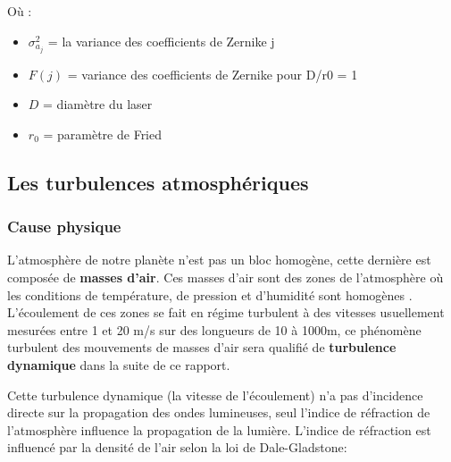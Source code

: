 Où :
\begin{itemize}
  \item $\sigma_{a_j}^2$ = la variance des coefficients de Zernike j
  \item  $F(j)$ = variance des coefficients de Zernike pour D/r0 = 1
  \item $D$ = diamètre du laser
  \item $r_0$ = paramètre de Fried
\end{itemize}

\subsection{Les turbulences atmosphériques}

\subsubsection{Cause physique}
L'atmosphère de notre planète n'est pas un bloc homogène, cette dernière est composée de \textbf{masses d'air}. Ces masses d'air
sont des zones de l'atmosphère où les conditions de température, de pression et d'humidité sont homogènes \cite{masse_air_wiki}\cite{masse_air_unige}.
L'écoulement de ces zones se fait en régime turbulent à des vitesses usuellement mesurées entre 1 et 20 m/s sur des longueurs de 10 à 1000m, ce phénomène
turbulent des mouvements de masses d'air sera qualifié de \textbf{turbulence dynamique} dans la suite de ce rapport.

Cette turbulence dynamique (la vitesse de l'écoulement) n'a pas d'incidence directe sur la propagation des ondes lumineuses, seul l'indice de réfraction de l'atmosphère influence la propagation
de la lumière. L'indice de réfraction est influencé par la densité de l'air selon la loi de Dale-Gladstone:




